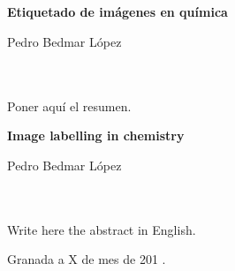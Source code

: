 \chapter*{}


\thispagestyle{empty}

\begin{center}
{\large\bfseries Etiquetado de imágenes en química}\\
\end{center}
\begin{center}
Pedro Bedmar López\\
\end{center}

\\

\vspace{0.7cm}
\\

Poner aquí el resumen.
\cleardoublepage


\thispagestyle{empty}


\begin{center}
{\large\bfseries Image labelling in chemistry}\\
\end{center}
\begin{center}
Pedro Bedmar López\\
\end{center}

\\

\vspace{0.7cm}
\\

Write here the abstract in English.



\begin{flushright}
Granada a X de mes de 201 .
\end{flushright}


\chapter*{}
\thispagestyle{empty}

